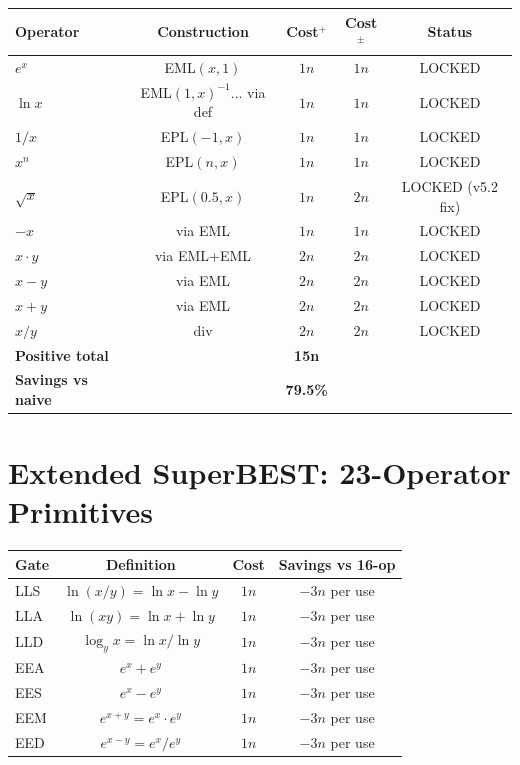 \documentclass[11pt]{article}
\begin{document}
\begin{center}
\begin{tabular}{lcccc}
\toprule
Operator & Construction & Cost$^+$ & Cost$^\pm$ & Status \\
\midrule
$e^x$ & EML$(x,1)$ & $1n$ & $1n$ & LOCKED \\
$\ln x$ & EML$(1,x)^{-1}$... via def & $1n$ & $1n$ & LOCKED \\
$1/x$ & EPL$(-1,x)$ & $1n$ & $1n$ & LOCKED \\
$x^n$ & EPL$(n,x)$ & $1n$ & $1n$ & LOCKED \\
$\sqrt{x}$ & EPL$(0.5,x)$ & $1n$ & $2n$ & LOCKED (v5.2 fix) \\
$-x$ & via EML & $1n$ & $1n$ & LOCKED \\
$x\cdot y$ & via EML+EML & $2n$ & $2n$ & LOCKED \\
$x-y$ & via EML & $2n$ & $2n$ & LOCKED \\
$x+y$ & via EML & $2n$ & $2n$ & LOCKED \\
$x/y$ & div & $2n$ & $2n$ & LOCKED \\
\midrule
\textbf{Positive total} & & \textbf{15n} & & \\
\textbf{Savings vs naive} & & \textbf{79.5\%} & & \\
\bottomrule
\end{tabular}
\end{center}

\section{Extended SuperBEST: 23-Operator Primitives}

\begin{center}
\begin{tabular}{lccc}
\toprule
Gate & Definition & Cost & Savings vs 16-op \\
\midrule
LLS & $\ln(x/y)=\ln x - \ln y$ & $1n$ & $-3n$ per use \\
LLA & $\ln(xy)=\ln x + \ln y$ & $1n$ & $-3n$ per use \\
LLD & $\log_y x = \ln x/\ln y$ & $1n$ & $-3n$ per use \\
EEA & $e^x+e^y$ & $1n$ & $-3n$ per use \\
EES & $e^x-e^y$ & $1n$ & $-3n$ per use \\
EEM & $e^{x+y}=e^x\cdot e^y$ & $1n$ & $-3n$ per use \\
EED & $e^{x-y}=e^x/e^y$ & $1n$ & $-3n$ per use \\
\bottomrule
\end{tabular}
\end{center}
\end{document}

